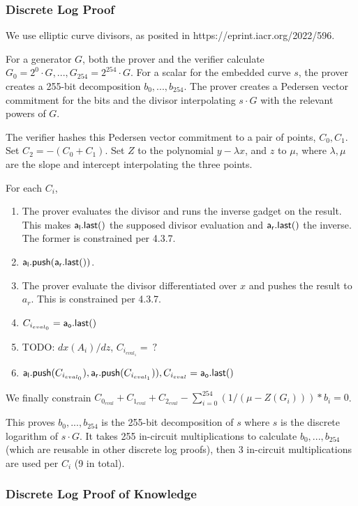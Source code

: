 \documentclass[]{article}
\begin{document}
\subsubsection{Discrete Log Proof}

We use elliptic curve divisors, as posited in https://eprint.iacr.org/2022/596.

For a generator $G$, both the prover and the verifier calculate $G_0 = 2^0 \cdot G, ...,G_{254} = 2^{254} \cdot G$. For a scalar for the embedded curve $s$, the prover creates a 255-bit decomposition $b_0, ..., b_{254}$. The prover creates a Pedersen vector commitment for the bits and the divisor interpolating $s \cdot G$ with the relevant powers of $G$.

The verifier hashes this Pedersen vector commitment to a pair of points, $C_0, C_1$. Set $C_2 = -(C_0 + C_1)$. Set $Z$ to the polynomial $y - \lambda x$, and $z$ to $\mu$, where $\lambda, \mu$ are the slope and intercept interpolating the three points.

For each $C_i$,

\begin{enumerate}
	\item The prover evaluates the divisor and runs the inverse gadget on the result. This makes $\mathsf{a_l.last()}$ the supposed divisor evaluation and $\mathsf{a_r.last()}$ the inverse. The former is constrained per 4.3.7.
	\item $\mathsf{a_l.push}(\mathsf{a_r.last()})$.
	\item The prover evaluate the divisor differentiated over $x$ and pushes the result to $a_r$. This is constrained per 4.3.7.
	\item $C_{i_{eval_0}} = \mathsf{a_o.last()}$
	\item TODO: $dx(A_i) / dz$, $C_{i_{eval_1}} = ~?$
	\item $\mathsf{a_l.push}(C_{i_{eval_0}}), \mathsf{a_r.push}(C_{i_{eval_1}})), C_{i_{eval}} = \mathsf{a_o.last()}$
\end{enumerate}

We finally constrain $C_{0_{eval}} + C_{1_{eval}} + C_{2_{eval}} - \sum_{i=0}^{254} (1 / (\mu - Z(G_i))) * b_i = 0$.

This proves $b_0, ..., b_{254}$ is the 255-bit decomposition of $s$ where $s$ is the discrete logarithm of $s \cdot G$. It takes 255 in-circuit multiplications to calculate $b_0, ..., b_{254}$ (which are reusable in other discrete log proofs), then 3 in-circuit multiplications are used per $C_i$ (9 in total).

\subsubsection{Discrete Log Proof of Knowledge}
\end{document}
